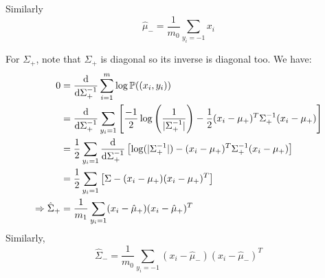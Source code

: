 \documentclass[a4paper, 11pt]{article}
\begin{document}
\begin{problem}
Similarly \begin{equation*}
\hat{\mu}_- = \frac{1}{m_0} \sum_{y_i = -1} x_i
\end{equation*}

For $\Sigma_+$, note that $\Sigma_+$ is diagonal so its inverse is diagonal too. We have:
\begin{align*}
0 &= \frac{\mathrm{d}}{\mathrm{d} \Sigma_+^{-1}} \sum_{i=1}^{m} \log \mathbb{P}((x_i, y_i)) \\
&= \frac{\mathrm{d}}{\mathrm{d} \Sigma_+^{-1}} \sum_{y_i = 1} \left[\frac{-1}{2} \log\left(\frac{1}{\lvert\Sigma_+^{-1}\rvert}\right) - \frac{1}{2} (x_i - \mu_+)^T\Sigma_+^{-1}(x_i - \mu_+)\right] \\
&= \frac{1}{2} \sum_{y_i = 1} \frac{\mathrm{d}}{\mathrm{d} \Sigma_+^{-1}} \left[\log(\lvert\Sigma_+^{-1}\rvert) -  (x_i - \mu_+)^T \Sigma_+^{-1} (x_i - \mu_+)\right] \\
&= \frac{1}{2} \sum_{y_i = 1} \left[\Sigma - (x_i - \mu_+) (x_i - \mu_+)^T \right]\\
\Rightarrow \hat{\Sigma}_+ &= \frac{1}{m_1} \sum_{y_i = 1} (x_i - \hat{\mu}_+) (x_i - \hat{\mu}_+)^T
\end{align*}
Similarly, \begin{equation*}
    \hat{\Sigma}_- = \frac{1}{m_0} \sum_{y_i = -1} (x_i - \hat{\mu}_-) (x_i - \hat{\mu}_-)^T
\end{equation*}


\end{problem}
\end{document}
